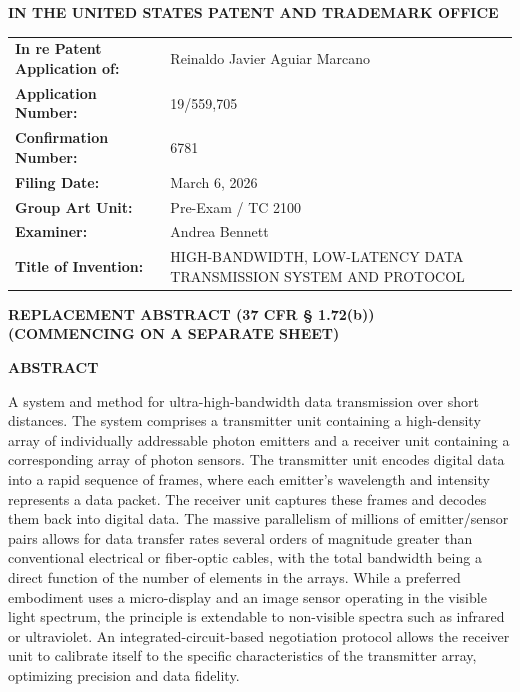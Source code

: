 \documentclass[11pt,letterpaper]{article}
\begin{document}
\thispagestyle{empty}

\begin{center}
    \large\textbf{IN THE UNITED STATES PATENT AND TRADEMARK OFFICE} \\
\end{center}

\vspace{0.2cm}
\noindent\begin{tabular}{p{2.3in}p{4.0in}}
\textbf{In re Patent Application of:} & Reinaldo Javier Aguiar Marcano \\
\textbf{Application Number:} & 19/559,705 \\
\textbf{Confirmation Number:} & 6781 \\
\textbf{Filing Date:} & March 6, 2026 \\
\textbf{Group Art Unit:} & Pre-Exam / TC 2100 \\
\textbf{Examiner:} & Andrea Bennett \\
\textbf{Title of Invention:} & HIGH-BANDWIDTH, LOW-LATENCY DATA TRANSMISSION SYSTEM AND PROTOCOL \\
\end{tabular}

\vspace{0.6cm}
\begin{center}
    \textbf{\large REPLACEMENT ABSTRACT (37 CFR \S{} 1.72(b))} \\
    \textbf{(COMMENCING ON A SEPARATE SHEET)}
\end{center}

\vspace{0.4cm}

\begin{center}
    \textbf{ABSTRACT}
\end{center}

A system and method for ultra-high-bandwidth data transmission over short distances. The system comprises a transmitter unit containing a high-density array of individually addressable photon emitters and a receiver unit containing a corresponding array of photon sensors. The transmitter unit encodes digital data into a rapid sequence of frames, where each emitter's wavelength and intensity represents a data packet. The receiver unit captures these frames and decodes them back into digital data. The massive parallelism of millions of emitter/sensor pairs allows for data transfer rates several orders of magnitude greater than conventional electrical or fiber-optic cables, with the total bandwidth being a direct function of the number of elements in the arrays. While a preferred embodiment uses a micro-display and an image sensor operating in the visible light spectrum, the principle is extendable to non-visible spectra such as infrared or ultraviolet. An integrated-circuit-based negotiation protocol allows the receiver unit to calibrate itself to the specific characteristics of the transmitter array, optimizing precision and data fidelity.
\end{document}
